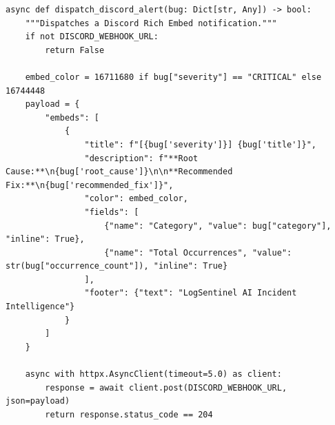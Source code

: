 \documentclass[12pt,a4paper]{article}
\begin{document}
\begin{lstlisting}[style=pystyle, caption={Asynchronous Webhook Integrations for Slack, Discord, and Jira}]
async def dispatch_discord_alert(bug: Dict[str, Any]) -> bool:
    """Dispatches a Discord Rich Embed notification."""
    if not DISCORD_WEBHOOK_URL:
        return False

    embed_color = 16711680 if bug["severity"] == "CRITICAL" else 16744448
    payload = {
        "embeds": [
            {
                "title": f"[{bug['severity']}] {bug['title']}",
                "description": f"**Root Cause:**\n{bug['root_cause']}\n\n**Recommended Fix:**\n{bug['recommended_fix']}",
                "color": embed_color,
                "fields": [
                    {"name": "Category", "value": bug["category"], "inline": True},
                    {"name": "Total Occurrences", "value": str(bug["occurrence_count"]), "inline": True}
                ],
                "footer": {"text": "LogSentinel AI Incident Intelligence"}
            }
        ]
    }

    async with httpx.AsyncClient(timeout=5.0) as client:
        response = await client.post(DISCORD_WEBHOOK_URL, json=payload)
        return response.status_code == 204
\end{lstlisting}

\clearpage
\end{document}
